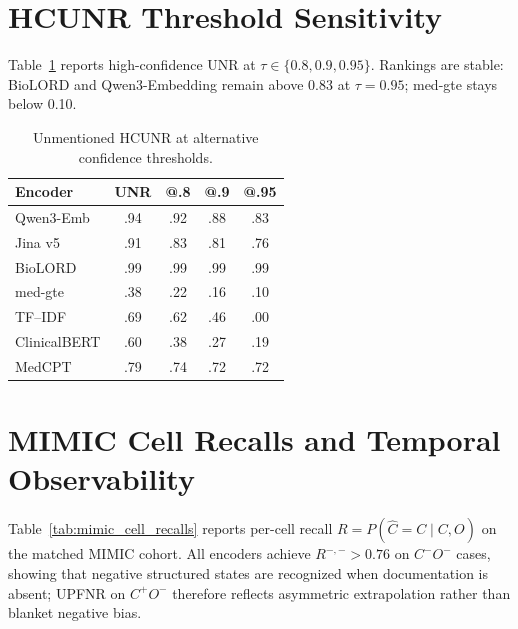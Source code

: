 \documentclass[11pt]{article}
\begin{document}
\section{HCUNR Threshold Sensitivity}
\label{app:hcunr_sensitivity}

Table~\ref{tab:hcunr_sensitivity} reports high-confidence UNR at
$\tau\in\{0.8,0.9,0.95\}$. Rankings are stable: BioLORD and Qwen3-Embedding
remain above 0.83 at $\tau=0.95$; med-gte stays below 0.10.

\begin{table}[!htbp]
  \centering
  \scriptsize
  \renewcommand{\arraystretch}{1.06}
  \caption{Unmentioned HCUNR at alternative confidence thresholds.}
  \label{tab:hcunr_sensitivity}
  \begin{tabular*}{\columnwidth}{@{\extracolsep{\fill}}lcccc@{}}
    \toprule
    \textbf{Encoder} & \textbf{UNR} & \textbf{@.8} & \textbf{@.9} &
    \textbf{@.95} \\
    \midrule
    Qwen3-Emb    & .94 & .92 & .88 & .83 \\
    Jina v5      & .91 & .83 & .81 & .76 \\
    BioLORD      & .99 & .99 & .99 & .99 \\
    med-gte      & .38 & .22 & .16 & .10 \\
    TF--IDF      & .69 & .62 & .46 & .00 \\
    ClinicalBERT & .60 & .38 & .27 & .19 \\
    MedCPT       & .79 & .74 & .72 & .72 \\
    \bottomrule
  \end{tabular*}
\end{table}

\section{MIMIC Cell Recalls and Temporal Observability}
\label{app:mimic_cells}

Table~\ref{tab:mimic_cell_recalls} reports per-cell recall
$R=P(\hat C=C\mid C,O)$ on the matched MIMIC cohort. All encoders achieve
$R^{-, -}>0.76$ on $C^-O^-$ cases, showing that negative structured states
are recognized when documentation is absent; UPFNR on $C^+O^-$ therefore reflects
asymmetric extrapolation rather than blanket negative bias.
\end{document}
